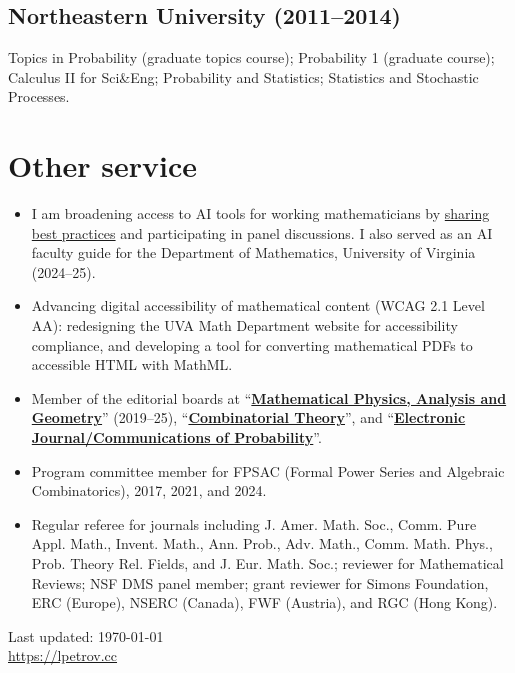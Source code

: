 \documentclass[letterpaper,11pt]{article}
\def\footerlink{https://lpetrov.cc}
\begin{document}
\subsection*{Northeastern University (2011--2014)}

Topics in Probability (graduate topics course);
Probability 1 (graduate course);
Calculus II for Sci\&Eng;
Probability and Statistics;
Statistics and Stochastic Processes.

\section*{Other service}

\begin{itemize}
	\item
	I am broadening access to AI tools for working mathematicians by \href{https://lpetrov.cc/AI-math/}{sharing} \href{https://storage.lpetrov.cc/research_files/talks/AI_UVA_Oct10.pdf}{best practices} and participating in panel discussions. I also served as an AI faculty guide for the Department of Mathematics, University of Virginia (2024--25).
	\item
	Advancing digital accessibility of mathematical content (WCAG 2.1 Level AA):
	redesigning the UVA Math Department website for accessibility compliance,
	and developing a tool for converting mathematical PDFs to accessible HTML with MathML.
	\item
	Member of the editorial boards at
	``\href{https://www.springer.com/journal/11040}{\textbf{Mathematical Physics, Analysis and Geometry}}'' (2019--25),
	``\href{https://escholarship.org/uc/combinatorial_theory/}{\textbf{Combinatorial Theory}}'',
	and ``\href{https://imstat.org/journals-and-publications/electronic-journal-of-probability/}{\textbf{Electronic Journal/Communications of Probability}}''.
	\item Program committee member for FPSAC (Formal Power Series and Algebraic Combinatorics),
		2017, 2021, and 2024.
	\item
	Regular referee for journals including
	J. Amer. Math. Soc.,
	Comm. Pure Appl. Math.,
	Invent. Math.,
	Ann. Prob.,
	Adv. Math.,
	Comm. Math. Phys.,
	Prob. Theory Rel. Fields,
	and J. Eur. Math. Soc.;
	reviewer for Mathematical Reviews;
	NSF DMS panel member;
	grant reviewer for Simons Foundation, ERC (Europe), NSERC (Canada), FWF (Austria), and RGC (Hong Kong).
\end{itemize}


\bigskip

\begin{center}
	\begin{footnotesize}
		Last updated: \today \\ \href{\footerlink}{\url{\footerlink}}
	\end{footnotesize}
\end{center}
\end{document}
